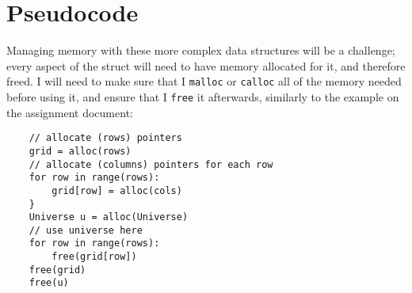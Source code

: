 \documentclass[12pt]{article}
\begin{document}
\section{Pseudocode}

Managing memory with these more complex data structures will be a challenge; every aspect of the struct will need to have memory allocated for it, and therefore freed. I will need to make sure that I \verb|malloc| or \verb|calloc| all of the memory needed before using it, and ensure that I \verb|free| it afterwards, similarly to the example on the assignment document:
\begin{verbatim}
    // allocate (rows) pointers
    grid = alloc(rows)
    // allocate (columns) pointers for each row
    for row in range(rows):
        grid[row] = alloc(cols)
    }
    Universe u = alloc(Universe)
    // use universe here
    for row in range(rows):
        free(grid[row])
    free(grid)
    free(u)
\end{verbatim}
\end{document}
